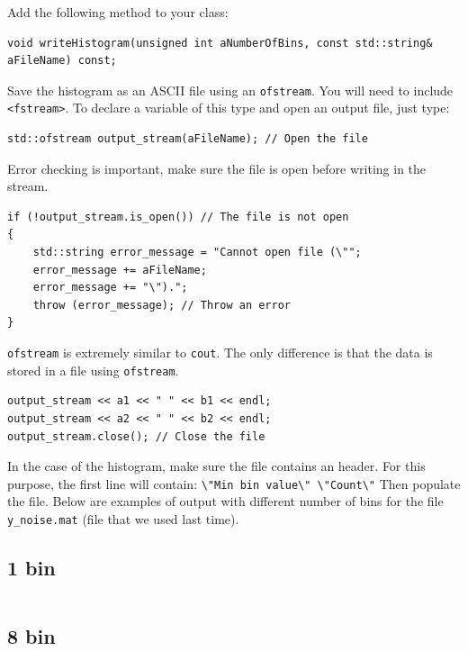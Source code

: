 \documentclass[english,a4paper,12pt,oneside]{article}
\begin{document}
Add the following method to your class:\\

\begin{lstlisting}
void writeHistogram(unsigned int aNumberOfBins, const std::string& aFileName) const;
\end{lstlisting}


Save the histogram as an ASCII file using an \verb+ofstream+. You will need to include \verb+<fstream>+.
To declare a variable of this type and open an output file, just type:
\begin{lstlisting}
std::ofstream output_stream(aFileName); // Open the file
\end{lstlisting}



Error checking is important, make sure the file is open before writing in the stream. 
\begin{lstlisting}
if (!output_stream.is_open()) // The file is not open
{
	std::string error_message = "Cannot open file (\"";
	error_message += aFileName;
	error_message += "\").";
	throw (error_message); // Throw an error
}
\end{lstlisting}

\verb+ofstream+ is extremely similar to \verb+cout+. 
The only difference is that the data is stored in a file using \verb+ofstream+. 
\begin{lstlisting}
output_stream << a1 << " " << b1 << endl;
output_stream << a2 << " " << b2 << endl;
output_stream.close(); // Close the file
\end{lstlisting}

In the case of the histogram, make sure the file contains an header. 
For this purpose, the first line will contain:
\verb+\"Min bin value\" \"Count\"+
Then populate the file. 
Below are examples of output with different number of bins for the file \verb+y_noise.mat+ (file that we used last time).

\subsection*{1 bin}
\begin{center}
\begin{tabular}{cc}

\end{tabular}
\end{center}

\subsection*{8 bin}
\begin{center}
\begin{tabular}{cc}

\end{tabular}
\end{center}
\end{document}
